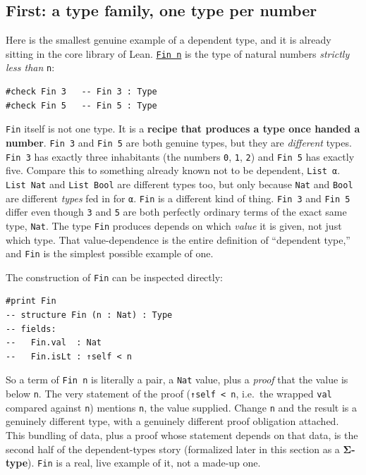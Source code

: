 \subsection{First: a type family, one type per number}\label{sec:01-basics:03-dependent-types:3}

Here is the smallest genuine example of a dependent type, and it is already sitting in the core library of Lean. \href{https://leanprover-community.github.io/mathlib4_docs/Init/Prelude.html\#Fin}{\texttt{Fin n}} is the type of natural numbers \emph{strictly less than} \texttt{n}:

\begin{lstlisting}
#check Fin 3   -- Fin 3 : Type
#check Fin 5   -- Fin 5 : Type
\end{lstlisting}

\texttt{Fin} itself is not one type. It is a \textbf{recipe that produces a type once handed a number}. \texttt{Fin 3} and \texttt{Fin 5} are both genuine types, but they are \emph{different} types. \texttt{Fin 3} has exactly three inhabitants (the numbers \texttt{0}, \texttt{1}, \texttt{2}) and \texttt{Fin 5} has exactly five. Compare this to something already known not to be dependent, \texttt{List α}. \texttt{List Nat} and \texttt{List Bool} are different types too, but only because \texttt{Nat} and \texttt{Bool} are different \emph{types} fed in for \texttt{α}. \texttt{Fin} is a different kind of thing. \texttt{Fin 3} and \texttt{Fin 5} differ even though \texttt{3} and \texttt{5} are both perfectly ordinary terms of the exact same type, \texttt{Nat}. The type \texttt{Fin} produces depends on which \emph{value} it is given, not just which type. That value-dependence is the entire definition of ``dependent type,'' and \texttt{Fin} is the simplest possible example of one.

The construction of \texttt{Fin} can be inspected directly:

\begin{lstlisting}
#print Fin
-- structure Fin (n : Nat) : Type
-- fields:
--   Fin.val  : Nat
--   Fin.isLt : ↑self < n
\end{lstlisting}

So a term of \texttt{Fin n} is literally a pair, a \texttt{Nat} value, plus a \emph{proof} that the value is below \texttt{n}. The very statement of the proof (\texttt{↑self < n}, i.e.~the wrapped \texttt{val} compared against \texttt{n}) mentions \texttt{n}, the value supplied. Change \texttt{n} and the result is a genuinely different type, with a genuinely different proof obligation attached. This bundling of data, plus a proof whose statement depends on that data, is the second half of the dependent-types story (formalized later in this section as a \textbf{Σ-type}). \texttt{Fin} is a real, live example of it, not a made-up one.

